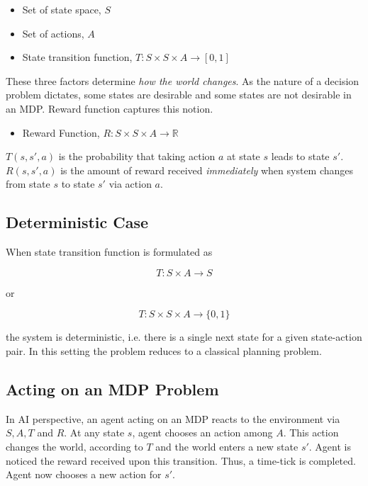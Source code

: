 \begin{itemize}
\item Set of state space, $S$
\item Set of actions, $A$
\item State transition function, $T : S \times S \times A \to [0,1]$
\end{itemize}

These three factors determine \emph{how the world changes}. As the nature of a decision problem dictates, some states are desirable and some states are not desirable in an MDP. Reward function captures this notion.

\begin{itemize}
\item Reward Function, $R : S \times S \times A \to \mathbb{R}$
\end{itemize}

$T(s, s', a)$ is the probability that taking action $a$ at state $s$ leads to state $s'$. $R(s, s', a)$ is the amount of reward received \emph{immediately} when system changes from state $s$ to state $s'$ via action $a$.

\subsection{Deterministic Case}

When state transition function is formulated as

\begin{displaymath}
T : S \times A \to S
\end{displaymath}

or

\begin{displaymath}
T : S \times S \times A \to \{0,1\}
\end{displaymath}

the system is deterministic, i.e. there is a single next state for a given state-action pair. In this setting the problem reduces to a classical planning problem.

\subsection{Acting on an MDP Problem}

In AI perspective, an agent acting on an MDP reacts to the environment via $S, A, T$ and $R$. At any state $s$, agent chooses an action among $A$. This action changes the world, according to $T$ and the world enters a new state $s'$. Agent is noticed the reward received upon this transition. Thus, a time-tick is completed. Agent now chooses a new action for $s'$.

